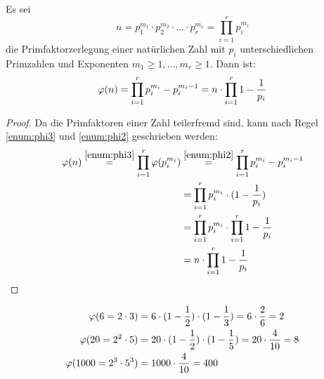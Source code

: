 \begin{satz}
  Es sei
  \begin{equation*}
    n = p_1^{m_1} \cdot p_2^{m_2} \cdot \ldots \cdot p_r^{m_r} = \prod_{i=1}^{r} p_i^{m_i}
  \end{equation*}
  die Primfaktorzerlegung einer natürlichen Zahl mit $p_i$ unterschiedlichen Primzahlen
  und Exponenten $m_1 \geq 1,\ldots, m_r \geq 1$. Dann ist:
  \begin{equation*}
    \varphi(n) = \prod_{i=1}^{r} p_i^{m_i} - p_i^{m_i - 1} =
    n \cdot \prod_{i=1}^{r} 1 - \frac{1}{p_i}
  \end{equation*}
\end{satz}
\newpage
\begin{proof}
  Da die Primfaktoren einer Zahl teilerfremd sind, kann nach Regel \ref{enum:phi3}
  und \ref{enum:phi2} geschrieben werden:
  \begin{align*}
    \varphi(n) \stackrel{\ref{enum:phi3}}{=} \prod_{i=1}^{r} \varphi(p_i^{m_i})
     & \stackrel{\ref{enum:phi2}}{=} \prod_{i=1}^{r} p_i^{m_i} - p_i^{m_i - 1}   \\
     & = \prod_{i=1}^{r} p_i^{m_i} \cdot (1 - \frac{1}{p_i})               \\
     & = \prod_{i=1}^{r} p_i^{m_i} \cdot \prod_{i=1}^{r} 1 - \frac{1}{p_i} \\
     & = n \cdot \prod_{i=1}^{r} 1 - \frac{1}{p_i}
  \end{align*}
\end{proof}

\begin{example}
  \begin{align*}
    \varphi(6 = 2 \cdot 3)        & = 6 \cdot (1 - \frac{1}{2}) \cdot (1 - \frac{1}{3}) =
    6 \cdot \frac{2}{6} = 2                                                              \\
    \varphi(20 = 2^2 \cdot 5)     & = 20 \cdot (1 - \frac{1}{2}) \cdot (1 - \frac{1}{5}) =
    20 \cdot \frac{4}{10} = 8                                                            \\
    \varphi(1000 = 2^3 \cdot 5^3) & = 1000 \cdot \frac{4}{10} = 400
  \end{align*}
\end{example}